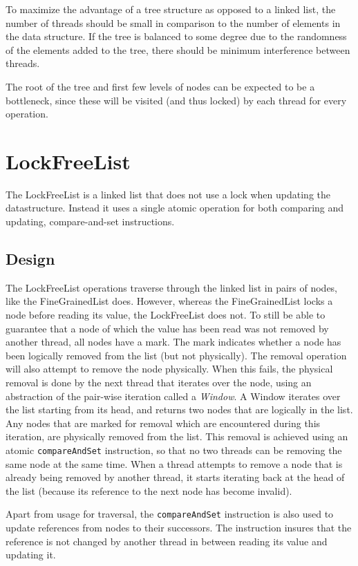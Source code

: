 \documentclass[a4paper]{article}
\begin{document}
To maximize the advantage of a tree structure as opposed to a linked list, the
number of threads should be small in comparison to the number of elements in the
data structure. If the tree is balanced to some degree due to the randomness of the
elements added to the tree, there should be minimum interference between threads.

The root of the tree and first few levels of nodes can be expected to be a bottleneck,
since these will be visited (and thus locked) by each thread for every operation.

\section{LockFreeList}

The LockFreeList is a linked list that does not use a lock when updating
the datastructure. Instead it uses a single atomic operation for both
comparing and updating, compare-and-set instructions.

\subsection{Design}

The LockFreeList operations traverse through the linked list in pairs of nodes, like
the FineGrainedList does. However, whereas the FineGrainedList locks a node before
reading its value, the LockFreeList does not. To still be able to guarantee that a
node of which the value has been read was not removed by another thread, all nodes
have a mark. The mark indicates whether a node has been logically removed from the
list (but not physically). The removal operation will also attempt to remove the node
physically. When this fails, the physical removal is done by the next thread that iterates over the node,
using an abstraction of the pair-wise iteration called a \emph{Window}. A Window iterates
over the list starting from its head, and returns two nodes that are logically in the
list. Any nodes that are marked for removal which are encountered during this iteration,
are physically removed from the list. This removal is achieved using an atomic
\texttt{compareAndSet} instruction, so that no two threads can be removing the same node 
at the same time. When a thread attempts to
remove a node that is already being removed by another thread, it starts iterating back
at the head of the list (because its reference to the next node has become invalid).

Apart from usage for traversal, the \texttt{compareAndSet} instruction is also used
to update references from nodes to their successors. The instruction insures that the
reference is not changed by another thread in between reading its value and updating
it.
\end{document}
